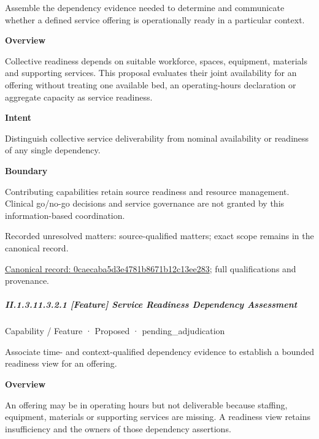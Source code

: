 Assemble the dependency evidence needed to determine and communicate whether a defined service offering is operationally ready in a particular context.



\textbf{Overview}



Collective readiness depends on suitable workforce, spaces, equipment, materials and supporting services. This proposal evaluates their joint availability for an offering without treating one available bed, an operating-hours declaration or aggregate capacity as service readiness.



\textbf{Intent}



Distinguish collective service deliverability from nominal availability or readiness of any single dependency.



\textbf{Boundary}



Contributing capabilities retain source readiness and resource management. Clinical go/no-go decisions and service governance are not granted by this information-based coordination.


{\small Recorded unresolved matters: source-qualified matters; exact scope remains in the canonical record.}\par
{\footnotesize \href{../../../../continuum/strategy/capability/0caecaba5d3e4781b8671b12c13ee283.md}{Canonical record: 0caecaba5d3e4781b8671b12c13ee283}; full qualifications and provenance.}\par
\subparagraph*{II.1.3.11.3.2.1 [Feature] Service Readiness Dependency Assessment}
\label{navigation:II.1.3.11.3.2.1}

\label{element:4d917929d5cf43218049a84cf46662b0}
{\small Capability / Feature · Proposed · pending\_adjudication}\par

Associate time- and context-qualified dependency evidence to establish a bounded readiness view for an offering.



\textbf{Overview}



An offering may be in operating hours but not deliverable because staffing, equipment, materials or supporting services are missing. A readiness view retains insufficiency and the owners of those dependency assertions.



